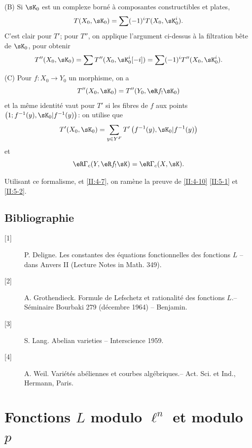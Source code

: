 (B) Si $\sK_0$ est un complexe borné à composantes constructibles et plates, 
\[
  T(X_0,\sK_0) = \sum (-1)^i T(X_0,\sK_0^i) \text{.}
\]
C'est clair pour $T'$; pour $T''$, on applique l'argument ci-dessus à la 
filtration bête de $\sK_0$, pour obtenir 
\[
  T''(X_0,\sK_0) = \sum T''(X_0,\sK_0^i[-i]) = \sum (-1)^i T''(X_0,\sK_0^i) \text{.}
\]

(C) Pour $f:X_0\to Y_0$ un morphisme, on a 
\[
  T''(X_0,\sK_0) = T''(Y_0,\eR f_! \sK_0)
\]
et la même identité vaut pour $T'$ si les fibres de $f$ aux points 
 $\left(1;f^{-1}(y),\sK_0|f^{-1}(y)\right)$: on 
utilise que 
\[
  T'(X_0,\sK_0) = \sum_{y\in Y^F} T'\left(f^{-1}(y), \sK_0|f^{-1}(y)\right)
\]
et 
\[
  \eR\Gamma_c(Y, \eR f_! \sK) = \eR\Gamma_c(X,\sK) \text{.}
\]

Utilisant ce formalisme, et \ref{II:4-7}, on ramène la preuve de \ref{II:4-10} 
 \ref{II:5-1} et \ref{II:5-2}.

\section*{Bibliographie}
\begin{description}
\item[{[1]}] P. Deligne. Les constantes des équations fonctionnelles des fonctions $L$ -- dans Anvers II (Lecture Notes in Math. 349).
\item[{[2]}] A. Grothendieck. Formule de Lefschetz et rationalité des fonctions $L$.-- Séminaire Bourbaki 279 (décembre 1964) -- Benjamin.
\item[{[3]}] S. Lang. Abelian varieties -- Interscience 1959.
\item[{[4]}] A. Weil. Variétés abéliennes et courbes algébriques.-- Act. Sci. et Ind., Hermann, Paris.
\end{description}
 




\chapter{Fonctions \texorpdfstring{$L$}{L} modulo \texorpdfstring{$\ell^n$}{l n} et modulo \texorpdfstring{$p$}{p}}\label{III}

